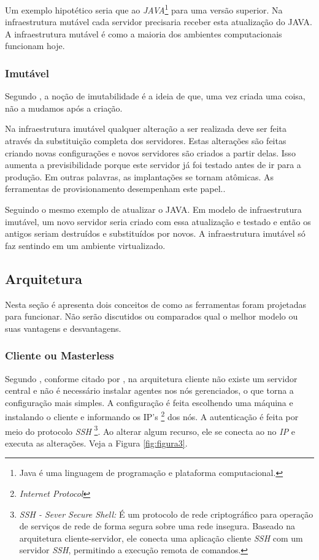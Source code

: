   Um exemplo hipotético seria que ao \textit{JAVA}\footnote{Java é uma linguagem de programação e plataforma computacional.} para uma versão superior. Na infraestrutura mutável cada servidor precisaria receber esta atualização do JAVA. A infraestrutura mutável é como a maioria dos ambientes computacionais funcionam hoje.
 
 \subsubsection{Imutável}
  Segundo , a noção de imutabilidade é a ideia de que, uma vez criada uma coisa, não a mudamos após a criação.
 
 Na infraestrutura imutável qualquer alteração a ser realizada deve ser feita através da substituição completa dos servidores. Estas alterações são feitas criando novas configurações e novos servidores são criados a partir delas. Isso aumenta a previsibilidade porque este servidor já foi testado antes de ir para a produção. Em outras palavras, as implantações se tornam atômicas. As ferramentas de provisionamento desempenham este papel.\cite{Morris:2016:ICM:3006361}.
 
 Seguindo o mesmo exemplo de atualizar o JAVA. Em modelo de infraestrutura imutável, um novo servidor seria criado com essa atualização e testado e então os antigos seriam destruídos e substituídos por novos. A infraestrutura imutável só faz sentindo em um ambiente virtualizado. 
 
\subsection{Arquitetura}

Nesta seção é apresenta dois conceitos de como as ferramentas foram projetadas para funcionar. Não serão discutidos ou comparados qual o melhor modelo ou suas vantagens e desvantagens. 

\subsubsection{Cliente ou Masterless} \label{semagent}
Segundo , conforme citado por , na arquitetura cliente não existe um servidor central e não é necessário instalar agentes nos nós gerenciados, o que torna a configuração mais simples. A configuração é feita escolhendo uma máquina e instalando o cliente e informando os IP's \footnote{\textit{Internet Protocol}} dos nós. A autenticação é feita por meio do protocolo \textit{SSH} \footnote{\textit{SSH - Sever Secure Shell:}  É um protocolo de rede criptográfico para operação de serviços de rede de forma segura sobre uma rede insegura. Baseado na arquitetura cliente-servidor, ele conecta uma aplicação cliente \textit{SSH} com um servidor \textit{SSH}, permitindo a execução remota de comandos.}. Ao alterar algum recurso, ele se conecta ao no \textit{IP} e executa as alterações. Veja a Figura \ref{fig:figura3}. 

